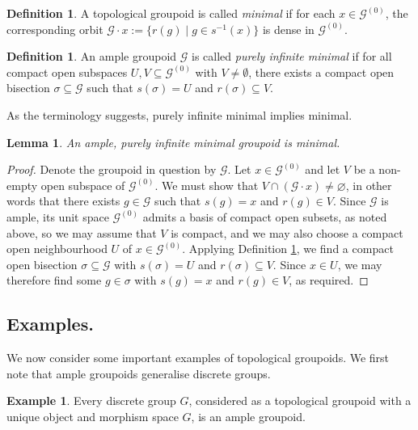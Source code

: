 \documentclass[10pt,a4paper]{amsart}
\numberwithin{equation}{section}
\numberwithin{figure}{section}
\newtheorem{lem}[thm]{Lemma}
\theoremstyle{definition}
\newtheorem{defn}[thm]{Definition}
\newtheorem{ex}[thm]{Example}
\newcommand{\cG}{\mathcal{G}}
\begin{document}
\begin{defn}
A topological groupoid is called \emph{minimal} if for each $x \in \mathcal{G}^{(0)}$, the corresponding orbit $\mathcal{G} \cdot x := \{r(g) \mid g\in s^{-1}(x)\}$ is dense in $\mathcal{G}^{(0)}$.
\end{defn}

\begin{defn}
\label{def:purely-inf-minimal}
An ample groupoid $\mathcal{G}$ is called \emph{purely infinite minimal} if for all compact open subspaces $U,V \subseteq \mathcal{G}^{(0)}$ with $V \neq \emptyset$, there exists a compact open bisection $\sigma \subseteq \mathcal{G}$ such that $s(\sigma) = U$ and $r(\sigma) \subseteq V$.
\end{defn}

As the terminology suggests, purely infinite minimal implies minimal.

\begin{lem}
An ample, purely infinite minimal groupoid is minimal.
\end{lem}
\begin{proof}
Denote the groupoid in question by $\cG$. Let $x \in \cG^{(0)}$ and let $V$ be a non-empty open subspace of $\cG^{(0)}$. We must show that $V \cap (\cG \cdot x) \neq \varnothing$, in other words that there exists $g \in \cG$ such that $s(g) = x$ and $r(g) \in V$. Since $\cG$ is ample, its unit space $\cG^{(0)}$ admits a basis of compact open subsets, as noted above, so we may assume that $V$ is compact, and we may also choose a compact open neighbourhood $U$ of $x \in \cG^{(0)}$. Applying Definition \ref{def:purely-inf-minimal}, we find a compact open bisection $\sigma \subseteq \cG$ with $s(\sigma) = U$ and $r(\sigma) \subseteq V$. Since $x \in U$, we may therefore find some $g \in \sigma$ with $s(g) = x$ and $r(g) \in V$, as required.
\end{proof}


\subsection{Examples.}

We now consider some important examples of topological groupoids. We first note that ample groupoids generalise discrete groups.

\begin{ex}
\label{ex:discrete-groups}
Every discrete group $G$, considered as a topological groupoid with a unique object and morphism space $G$, is an ample groupoid.
\end{ex}
\end{document}
